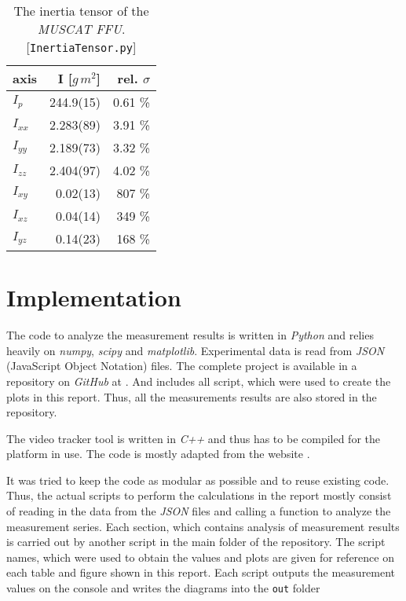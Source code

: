\documentclass[journal]{IEEEtran}
\begin{document}
\begin{table}
	\centering
	\begin{tabular}{l | r r}
		axis	& I [$\unit{g\,m^2}$]		& rel. $\sigma$ \\
		\hline
		$I_p$		& 244.9(15)	& 0.61 \% \\
		$I_{xx}$	&	2.283(89)	& 3.91 \% \\
		$I_{yy}$	&	2.189(73)	& 3.32 \% \\
		$I_{zz}$	&	2.404(97)	& 4.02 \% \\
		$I_{xy}$	&	0.02(13)	& 807 \% \\
		$I_{xz}$	&	0.04(14)	& 349 \% \\
		$I_{yz}$	&	0.14(23)	& 168 \% \\
	\end{tabular}
	\caption{The inertia tensor of the \emph{MUSCAT FFU}. [\texttt{InertiaTensor.py}]}
	\label{tab:FFUInertiaTensor}
\end{table}

\section{Implementation}

The code to analyze the measurement results is written in \emph{Python} and relies heavily on \emph{numpy}, \emph{scipy} and \emph{matplotlib}.
Experimental data is read from \emph{JSON} (JavaScript Object Notation) files.
The complete project is available in a repository on \emph{GitHub} at \cite{website:github}.
And includes all script, which were used to create the plots in this report.
Thus, all the measurements results are also stored in the repository. 

The video tracker tool is written in \emph{C++} and thus has to be compiled for the platform in use. The code is mostly adapted from the website \cite{website:opencv}.

It was tried to keep the code as modular as possible and to reuse existing code. Thus, the actual scripts to perform the calculations in the report mostly consist of reading in the data from the \emph{JSON} files and calling a function to analyze the measurement series.
Each section, which contains analysis of measurement results is carried out by another script in the main folder of the repository. The script names, which were used to obtain the values and plots are given for reference on each table and figure shown in this report.
Each script outputs the measurement values on the console and writes the diagrams into the \texttt{out} folder 
\end{document}
